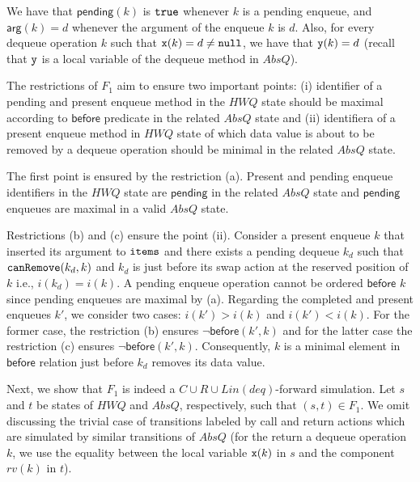 \noindent
We have that $\mathsf{pending}(k)$ is ${\tt true}$ whenever $k$ is a pending enqueue, and $\mathsf{arg}(k)=d$ whenever the argument of the enqueue $k$ is $d$.
Also, for every dequeue operation $k$ such that ${\tt x}(k)=d\neq {\tt null}$, we have that ${\tt y}(k)=d$ (recall that ${\tt y}$ is a local variable of the dequeue method in $AbsQ$).

The restrictions of $F_1$ aim to ensure two important points:  (i) identifier of a pending and present enqueue method in the $\mathit{HWQ}$ state should be maximal according to $\mathsf{before}$ predicate in the related $AbsQ$ state and (ii) identifiera of a present enqueue method in $\mathit{HWQ}$ state of which data value is about to be removed by a dequeue operation should be minimal in the related $AbsQ$ state.

The first point is ensured by the restriction (a). Present and pending enqueue identifiers in the $\mathit{HWQ}$ state are $\mathsf{pending}$ in the related $AbsQ$ state and $\mathsf{pending}$ enqueues are maximal in a valid $AbsQ$ state.

Restrictions (b) and (c) ensure the point (ii). Consider a present enqueue $k$ that inserted its argument to ${\tt items}$ and  there exists a pending dequeue $k_d$ such that ${\tt canRemove}(k_d, k)$ and $k_d$ is just before its swap action at the reserved position of $k$ i.e., $i(k_d) = i(k)$. A pending enqueue operation cannot be ordered $\mathsf{before}$ $k$ since pending enqueues are maximal by (a). Regarding the completed and present enqueues $k'$, we consider two cases: $i(k') > i(k)$ and $i(k') < i(k)$. For the former case, the restriction (b) ensures $\neg \mathsf{before}(k',k)$ and for the latter case the restriction (c) ensures $\neg \mathsf{before}(k',k)$. Consequently, $k$ is a minimal element in $\mathsf{before}$ relation just before $k_d$ removes its data value.

Next, we show that $F_1$ is indeed a $C\cup R\cup Lin(deq)$-forward simulation. Let $s$ and $t$ be states of $\mathit{HWQ}$ and $AbsQ$, respectively, such that $(s,t)\in F_1$.
We omit discussing the trivial case of transitions labeled by call and return actions which are simulated by similar transitions of $AbsQ$ (for the return a dequeue operation $k$, we use the equality between the local variable ${\tt x}(k)$ in $s$ and the component $rv(k)$ in $t$).

